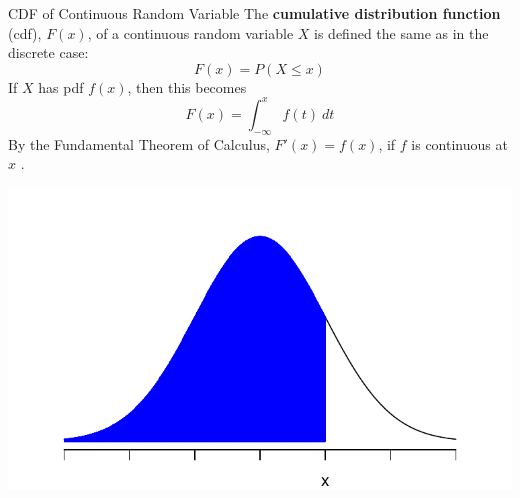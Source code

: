 \documentclass{beamer}
\renewcommand{\emph}{\textbf}
\begin{document}
\begin{frame}{CDF of Continuous Random Variable}
The \emph{cumulative distribution function} (cdf), $F(x)$, of a continuous random variable $X$ is defined the same as in the discrete case:
$$F(x) = P(X \leq x)$$
\pause If $X$ has pdf $f(x)$, then this becomes
$$F(x) = \int_{-\infty}^x f(t)\ dt$$
\pause By the Fundamental Theorem of Calculus, $F'(x)=f(x)$, if $f$ is continuous at $x$ .
\vspace{-.5cm}
\begin{center}
\includegraphics[scale=.5]{ch4_cdf_norm.pdf}
\end{center}
\end{frame}
\end{document}
